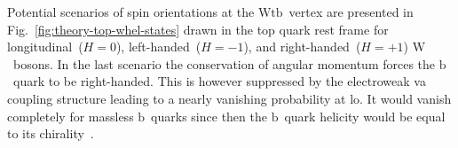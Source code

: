 
Potential scenarios of spin orientations at the $\mathrm{Wtb}$~vertex are presented in Fig.~\ref{fig:theory-top-whel-states} drawn in the top quark rest frame for longitudinal~($H=0$), left-handed~($H=-1$), and right-handed~($H=+1$) $\mathrm{W}$~bosons. In the last scenario the conservation of angular momentum forces the $\mathrm{b}$~quark to be right-handed. This is however suppressed by the electroweak \gls{va} coupling structure leading to a nearly vanishing probability at \gls{lo}. It would vanish completely for massless $\mathrm{b}$~quarks since then the $\mathrm{b}$~quark helicity would be equal to its chirality~\cite{Bernreuther:2008ju}.


